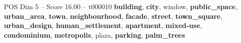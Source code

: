 \begin{textsample}{POS Dim 5 – Score 16.00 – t000010}  \label{ex:f5_pos_028}
\textbf{building}, \textbf{city}, window, \textbf{public\_space}, \textbf{urban\_area}, \textbf{town}, \textbf{neighbourhood}, \textbf{facade}, \textbf{street}, \textbf{town\_square}, \textbf{urban\_design}, \textbf{human\_settlement}, \textbf{apartment}, \textbf{mixed-use}, \textbf{condominium}, \textbf{metropolis}, plaza, \textbf{parking}, \textbf{palm\_trees}

\end{textsample}
